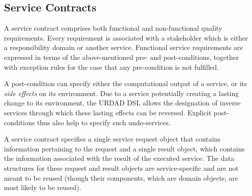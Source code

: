 \subsection{Service Contracts}

A service contract comprises both functional and non-functional quality requirements. Every requirement is associated with a stakeholder which is either a responsibility domain or another service. Functional service requirements are expressed in terms of the above-mentioned pre- and post-conditions, together with exception rules for the case that any pre-condition is not fulfilled. 

A post-condition can specify either the computational output of a service, or its \emph{side effects} on its environment. Due to a service potentially creating a lasting change to its environment, the URDAD DSL allows the designation of inverse services through which these lasting effects can be reversed. Explicit post-conditions thus also help to specify such undo-services.

A service contract specifies a single service request object that contains information pertaining to the request and a single result object, which contains the information associated with the result of the executed service. The data structures for these request and result objects are service-specific and are not meant to be reused (though their components, which are domain objects, are most likely to be reused). 

